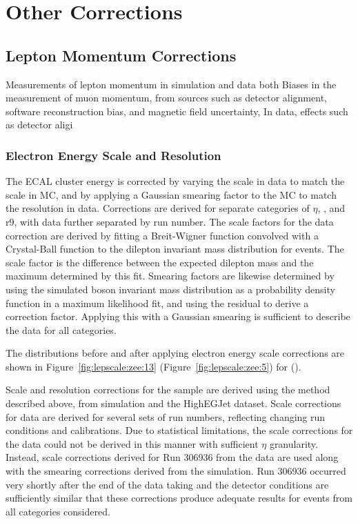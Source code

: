 \chapter{Other Corrections}\label{ch:corrs}
\section{Lepton Momentum Corrections}
Measurements of lepton momentum in simulation and data both 
Biases in the measurement of muon momentum, from sources such as detector alignment, software reconstruction bias, and magnetic field uncertainty,
In data, effects such as detector aligi
\subsection{Electron Energy Scale and Resolution}
The ECAL cluster energy is corrected by varying the scale in data to match the scale in MC, and by applying a Gaussian smearing factor to the MC to match the resolution in data. Corrections are derived for separate categories of $\eta$, \et, and r9, with data further separated by run number. The scale factors for the data correction are derived by fitting a Breit-Wigner function convolved with a Crystal-Ball function to the dilepton invariant mass distribution for \zee events. The scale factor is the difference between the expected dilepton mass and the maximum determined by this fit. Smearing factors are likewise determined by using the simulated \Z boson invariant mass distribution as a probability density function in a maximum likelihood fit, and using the residual to derive a correction factor. Applying this with a Gaussian smearing is sufficient to describe the data for all categories\cite{Khachatryan:2015iwa}.

The \mll distributions before and after applying electron energy scale corrections are shown in Figure~\ref{fig:lepscale:zee:13} (Figure~\ref{fig:lepscale:zee:5}) for \serah (\serag). 




Scale and resolution corrections for the \serah sample are derived using the method described above, from \zll simulation and the HighEGJet dataset. Scale corrections for data are derived for several sets of run numbers, reflecting changing run conditions and calibrations. Due to statistical limitations, the scale corrections for the \serag data could not be derived in this manner with sufficient $\eta$ granularity. Instead, scale corrections derived for Run 306936 from the \serah data are used along with the smearing corrections derived from the \serah simulation. Run 306936 occurred very shortly after the end of the \serag data taking and the detector conditions are sufficiently similar that these corrections produce adequate results for events from all categories considered.

